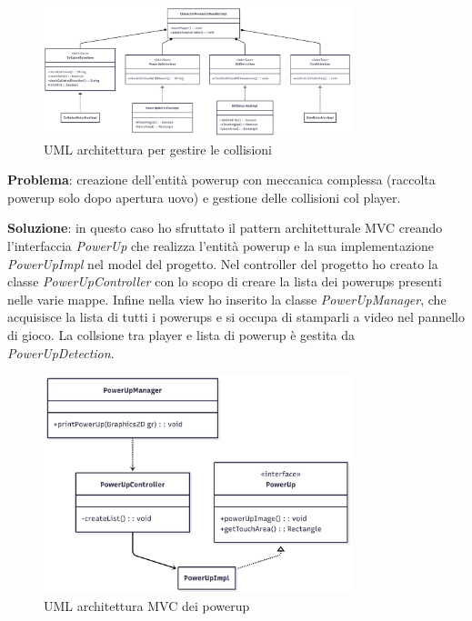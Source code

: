\documentclass[a4paper,12pt]{report}
\begin{document}
\begin{figure}[H]
    \centering
    \includegraphics[width=0.8\textwidth]{resources/Collisions.png}
    \caption{UML architettura per gestire le collisioni}
    \label{fig:2.3}
\end{figure}

\textbf{Problema}: creazione dell'entità powerup con meccanica complessa (raccolta powerup solo dopo apertura uovo) e gestione 
delle collisioni col player.\vspace{1cm}

\textbf{Soluzione}: in questo caso ho sfruttato il pattern architetturale MVC creando l'interfaccia \emph{PowerUp} che realizza l'entità powerup 
e la sua implementazione \emph{PowerUpImpl} nel model del progetto. Nel controller del progetto ho creato la classe \emph{PowerUpController} 
con lo scopo di creare la lista dei powerups presenti nelle varie mappe. Infine nella view ho inserito la classe \emph{PowerUpManager}, 
che acquisisce la lista di tutti i powerups e si occupa di stamparli a video nel pannello di gioco. La collsione tra player e lista 
di powerup è gestita da \emph{PowerUpDetection}.

\begin{figure}[H]
    \centering
    \includegraphics[width=0.8\textwidth]{resources/Powerup.png}
    \caption{UML architettura MVC dei powerup}
    \label{fig:2.4}
\end{figure}
\end{document}
